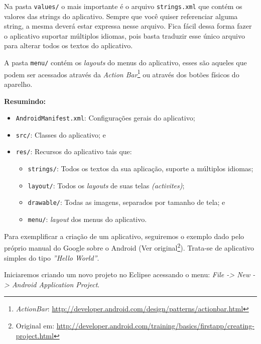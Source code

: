\documentclass[a4paper,12pt,brazil]{book}
\begin{document}
Na pasta \texttt{values/} o mais importante é o arquivo \texttt{strings.xml} que contém os valores das strings do aplicativo. Sempre que você quiser referenciar alguma string, a mesma deverá estar expressa nesse arquivo. Fica fácil dessa forma fazer o aplicativo suportar múltiplos idiomas, pois basta traduzir esse único arquivo para alterar todos os textos do aplicativo.

A pasta \texttt{menu/} contém os \emph{layouts} do menus do aplicativo, esses são aqueles que podem ser acessados através da \emph{Action Bar}\footnote{\emph{ActionBar}: \href{http://developer.android.com/design/patterns/actionbar.html}{http://developer.android.com/design/patterns/actionbar.html}} ou através dos botões físicos do aparelho.

\newpage
\textbf{Resumindo:}
\begin{itemize}[noitemsep, nolistsep]
\item \texttt{AndroidManifest.xml}: Configurações gerais do aplicativo;
\item \texttt{src/}: Classes do aplicativo; e
\item \texttt{res/}: Recursos do aplicativo tais que:
	\begin{itemize}[nolistsep, noitemsep]
		\item \texttt{strings/}: Todos os textos da sua aplicação, suporte a múltiplos idiomas;	
		\item \texttt{layout/}: Todos os \emph{layouts} de suas telas \emph{(activites)};
		\item \texttt{drawable/}: Todas as imagens, separados por tamanho de tela; e
		\item \texttt{menu/}: \emph{layout} dos menus do aplicativo.
	\end{itemize}
\end{itemize}


Para exemplificar a criação de um aplicativo, seguiremos o exemplo dado pelo próprio manual do Google sobre o Android 
(Ver original\footnote{Original em: \href{http://developer.android.com/training/basics/firstapp/creating-project.html}{http://developer.android.com/training/basics/firstapp/creating-project.html}}). 
Trata-se de aplicativo simples do tipo \emph{''Hello World''}.

Iniciaremos criando um novo projeto no Eclipse acessando o menu: \emph{File -> New -> Android Application Project}.
\end{document}
